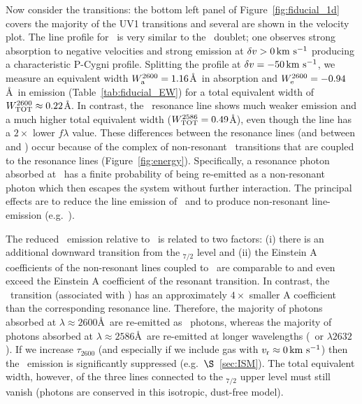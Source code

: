 \documentclass[]{emulateapj}
\begin{document}
Now consider the  transitions:
the bottom left panel of Figure~\ref{fig:fiducial_1d} covers the
majority of the  UV1 transitions and several are
shown in the velocity plot.  The line
profile for \feiib\ is very similar to the \mgiid\ doublet;
one observes strong absorption to negative velocities and strong
emission at $\delta v > 0 \, {\rm km~s^{-1}}$ producing a characteristic P-Cygni profile. 
Splitting
the profile at $\delta v = -50 \, {\rm km~s^{-1}}$, we measure an equivalent width
$W^{2600}_{\rm a} = 1.16$\AA\ in absorption and $W^{2600}_{\rm e} =
-0.94$\AA\ in emission (Table~\ref{tab:fiducial_EW}) for a total
equivalent width of $W^{2600}_{\rm TOT} \approx 0.22$\AA.  
In contrast, the \feiia\ resonance line shows much weaker emission and
a much higher total equivalent width ($W^{2586}_{\rm TOT} = 0.49$\AA),
even though the line has a $2 \times$ lower $f\lambda$ value.
These differences between the  resonance lines (and between
 and ) occur because of the complex of non-resonant
\feiis\ transitions that are coupled to the resonance lines
(Figure~\ref{fig:energy}).  Specifically, 
a resonance photon absorbed at \feiid\ has a finite probability of
being re-emitted as a non-resonant photon which then escapes the system
without further interaction.  The principal effects are to reduce the
line emission of \feiid\ and to produce non-resonant line-emission (e.g.\
\feiic).

The reduced \feiia\ emission relative to \feiib\ is related to
two factors:
(i) there is an additional downward transition from the
\zconfig$_{7/2}$ level and 
(ii) the Einstein A
coefficients of the non-resonant lines coupled to \feiia\ are comparable to and even
exceed the Einstein A coefficient of
the resonant transition.  In contrast, 
the \feiie\ transition (associated with \feiib)
has an approximately  $4\times$ smaller A coefficient than the
corresponding
resonance line.  Therefore, the majority of photons absorbed at
$\lambda \approx 2600$\AA\ are re-emitted as \feiib\ photons, whereas 
the majority of photons absorbed at $\lambda \approx 2586$\AA\ are re-emitted 
at longer wavelengths (\feiic\ or $\lambda 2632$).
If we %
increase $\tau_{2600}$ (and especially if we include
gas with $v_{\rm r} \approx 0 \, {\rm km~s^{-1}}$) then the \feiib\ emission is
significantly suppressed (e.g.\ $\S$~\ref{sec:ISM}).
The total equivalent width, however, of the three lines connected to the
\zconfig$_{7/2}$ upper level must still vanish (photons are conserved
in this isotropic, dust-free model).
\end{document}
